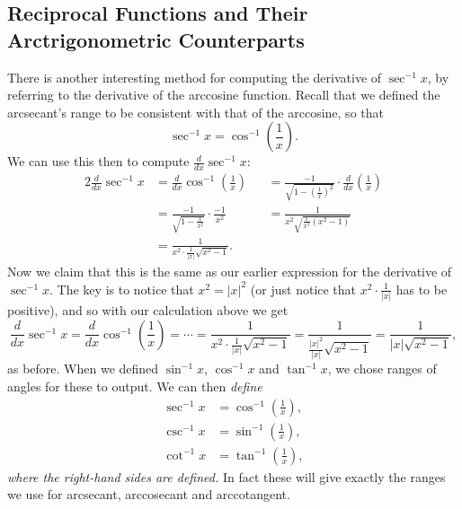 \subsection{Reciprocal Functions and Their Arctrigonometric Counterparts}
There is another interesting method for computing the 
derivative of $\sec^{-1}x$, by referring to the
derivative of the arccosine function.
Recall that we defined the arcsecant's range to be consistent
with that of the arccosine, so that
\begin{equation}\sec^{-1}x=\cos^{-1}\left(\frac1x\right).\end{equation}
We can use this then to compute $\frac{d}{dx}\sec^{-1}x$:
\begin{alignat*}{2}
\frac{d}{dx}\sec^{-1}x
   &=\frac{d}{dx}\cos^{-1}\left(\frac1x\right)
   &&=\frac{-1}{\sqrt{1-\left(\frac1x\right)^2}}\cdot\frac{d}{dx}\left(\frac1x
               \right)\\
   &=\frac{-1}{\sqrt{1-\frac1{x^2}}}\cdot\frac{-1}{x^2}
   &&=\frac{1}{x^2\sqrt{\frac1{x^2}\left(x^2-1\right)}}\\ 
   &=\frac1{x^2\cdot\frac1{|x|}\sqrt{x^2-1}}.
\end{alignat*}
Now we claim that this is the same as our earlier expression for the
derivative of $\sec^{-1}x$.  The key is to notice that $x^2=|x|^2$
(or just notice that $x^2\cdot\frac1{|x|}$ has to be positive), and
so with our calculation above we get
$$\frac{d}{dx}\sec^{-1}x=\frac{d}{dx}\cos^{-1}\left(\frac1x\right)
                =\cdots=\frac1{x^2\cdot\frac1{|x|}\sqrt{x^2-1}}
                   =\frac1{\frac{|x|^2}{|x|}\sqrt{x^2-1}}
                        =\frac1{|x|\sqrt{x^2-1}},$$
as before. 
When we defined $\sin^{-1}x$, $\cos^{-1}x$ and $\tan^{-1}x$,
we chose ranges of angles for these to output.  We can then
{\it define}
\begin{align}
\sec^{-1}x&=\cos^{-1}\left(\frac1x\right),\label{Asec-WRT-Acos}\\
\csc^{-1}x&=\sin^{-1}\left(\frac1x\right),\label{Acsc-WRT-Asin}\\
\cot^{-1}x&=\tan^{-1}\left(\frac1x\right),\label{Acot-WRT-Atan}\end{align}
{\it where the right-hand sides are defined. } 
In fact these will give exactly the ranges we use for 
arcsecant, arccosecant and arccotangent.\footnotemark

